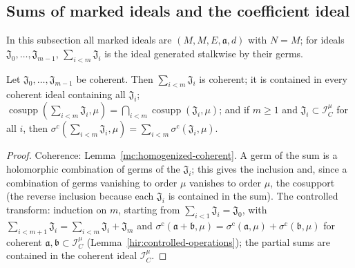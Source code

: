 \subsection{Sums of marked ideals and the coefficient ideal}

In this subsection all marked ideals are \((M,M,E,\mathfrak a,d)\) with \(N=M\); for ideals \(\mathfrak J_0,\dots,\mathfrak J_{m-1}\),
\(\sum_{i<m}\mathfrak J_i\) is the ideal generated stalkwise by their germs.

\begin{lemma}
\label{mc:finite-sum}
\leanok
Let \(\mathfrak J_0,\dots,\mathfrak J_{m-1}\) be coherent. Then \(\sum_{i<m}\mathfrak J_i\) is coherent; it is contained in every coherent ideal containing all
\(\mathfrak J_i\); \(\operatorname{cosupp}(\sum_{i<m}\mathfrak J_i,\mu)=\bigcap_{i<m}\operatorname{cosupp}(\mathfrak J_i,\mu)\); and if \(m\ge1\) and
\(\mathfrak J_i\subset\mathcal I_C^\mu\) for all \(i\), then \(\sigma^{\mathrm c}(\sum_{i<m}\mathfrak J_i,\mu)=\sum_{i<m}\sigma^{\mathrm c}(\mathfrak J_i,\mu)\).
\end{lemma}
\begin{proof}
\leanok
Coherence: Lemma~\ref{mc:homogenized-coherent}. A germ of the sum is a holomorphic combination of germs of the \(\mathfrak J_i\); this gives the
inclusion and, since a combination of germs vanishing to order \(\mu\) vanishes to order \(\mu\), the cosupport (the reverse inclusion because each
\(\mathfrak J_i\) is contained in the sum). The controlled transform: induction on \(m\), starting from \(\sum_{i<1}\mathfrak J_i=\mathfrak J_0\), with
\(\sum_{i<m+1}\mathfrak J_i=\sum_{i<m}\mathfrak J_i+\mathfrak J_m\) and \(\sigma^{\mathrm c}(\mathfrak a+\mathfrak b,\mu)=\sigma^{\mathrm c}(\mathfrak a,\mu)+\sigma^{\mathrm c}(\mathfrak b,\mu)\)
for coherent \(\mathfrak a,\mathfrak b\subset\mathcal I_C^\mu\) (Lemma~\ref{hir:controlled-operations}); the partial sums are contained in the coherent ideal \(\mathcal I_C^\mu\).
\end{proof}


